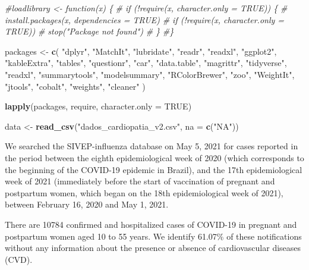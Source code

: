 \documentclass[
]{article}
\newenvironment{Shaded}{\begin{snugshade}}{\end{snugshade}}
\newcommand{\AttributeTok}[1]{\textcolor[rgb]{0.13,0.29,0.53}{#1}}
\newcommand{\CommentTok}[1]{\textcolor[rgb]{0.56,0.35,0.01}{\textit{#1}}}
\newcommand{\ConstantTok}[1]{\textcolor[rgb]{0.56,0.35,0.01}{#1}}
\newcommand{\FunctionTok}[1]{\textcolor[rgb]{0.13,0.29,0.53}{\textbf{#1}}}
\newcommand{\NormalTok}[1]{#1}
\newcommand{\OtherTok}[1]{\textcolor[rgb]{0.56,0.35,0.01}{#1}}
\newcommand{\StringTok}[1]{\textcolor[rgb]{0.31,0.60,0.02}{#1}}
\begin{document}
\begin{Shaded}
\begin{Highlighting}[]
\CommentTok{\#loadlibrary \textless{}{-} function(x) \{}
\CommentTok{\#  if (!require(x, character.only = TRUE)) \{}
\CommentTok{\#    install.packages(x, dependencies = TRUE)}
\CommentTok{\#    if (!require(x, character.only = TRUE))}
\CommentTok{\#      stop("Package not found")}
\CommentTok{\#  \}}
\CommentTok{\#\}}

\NormalTok{packages }\OtherTok{\textless{}{-}} \FunctionTok{c}\NormalTok{(}
    \StringTok{"dplyr"}\NormalTok{,}
    \StringTok{"MatchIt"}\NormalTok{,}
    \StringTok{"lubridate"}\NormalTok{,}
    \StringTok{"readr"}\NormalTok{,}
    \StringTok{"readxl"}\NormalTok{,}
    \StringTok{"ggplot2"}\NormalTok{,}
    \StringTok{"kableExtra"}\NormalTok{,}
    \StringTok{"tables"}\NormalTok{,}
    \StringTok{"questionr"}\NormalTok{,}
    \StringTok{"car"}\NormalTok{,}
    \StringTok{"data.table"}\NormalTok{,}
    \StringTok{"magrittr"}\NormalTok{,}
    \StringTok{"tidyverse"}\NormalTok{,}
    \StringTok{"readxl"}\NormalTok{,}
    \StringTok{"summarytools"}\NormalTok{,}
    \StringTok{"modelsummary"}\NormalTok{,}
    \StringTok{"RColorBrewer"}\NormalTok{,}
    \StringTok{"zoo"}\NormalTok{,}
    \StringTok{"WeightIt"}\NormalTok{,}
    \StringTok{"jtools"}\NormalTok{,}
    \StringTok{"cobalt"}\NormalTok{,}
    \StringTok{"weights"}\NormalTok{, }
    \StringTok{"cleaner"}
\NormalTok{  )}

\FunctionTok{lapply}\NormalTok{(packages, require, }\AttributeTok{character.only =} \ConstantTok{TRUE}\NormalTok{)}

\NormalTok{data }\OtherTok{\textless{}{-}} \FunctionTok{read\_csv}\NormalTok{(}\StringTok{"dados\_cardiopatia\_v2.csv"}\NormalTok{, }\AttributeTok{na =} \FunctionTok{c}\NormalTok{(}\StringTok{"NA"}\NormalTok{))}
\end{Highlighting}
\end{Shaded}

We searched the SIVEP-influenza database on May 5, 2021 for cases
reported in the period between the eighth epidemiological week of 2020
(which corresponds to the beginning of the COVID-19 epidemic in Brazil),
and the 17th epidemiological week of 2021 (immediately before the start
of vaccination of pregnant and postpartum women, which began on the 18th
epidemiological week of 2021), between February 16, 2020 and May 1,
2021.

There are 10784 confirmed and hospitalized cases of COVID-19 in pregnant
and postpartum women aged 10 to 55 years. We identify 61.07\% of these
notifications without any information about the presence or absence of
cardiovascular diseases (CVD).
\end{document}

